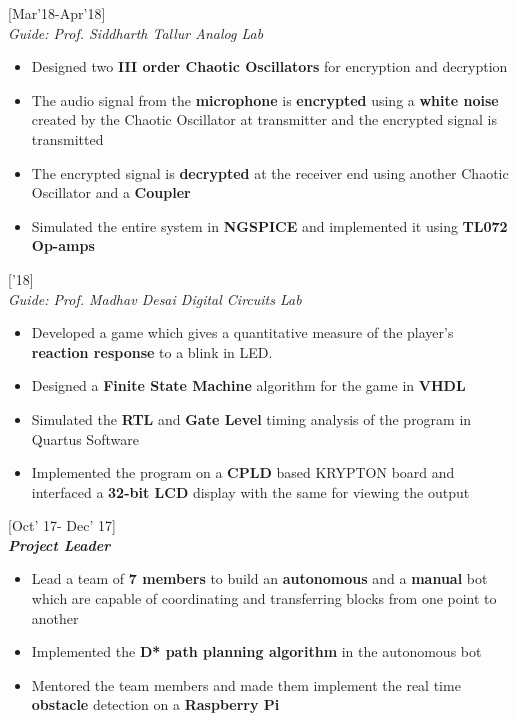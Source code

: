 \documentclass{article}
\begin{document}
 \hfill{\small [Mar'18-Apr'18]}\\
{\it Guide: Prof. Siddharth Tallur \textbar Analog Lab} \\
\vspace{-17pt}
\begin{itemize}[itemsep = -0.75 mm, leftmargin=*]
\item Designed two {\bf III order Chaotic Oscillators} for encryption and decryption
\item The audio signal from the {\bf microphone} is {\bf encrypted} using a {\bf white noise} created by the Chaotic Oscillator at transmitter and the encrypted signal is transmitted
\item The encrypted signal is {\bf decrypted} at the receiver end using another Chaotic Oscillator and a {\bf Coupler}
\item Simulated the entire system in {\bf NGSPICE} and implemented it using {\bf TL072 Op-amps}
\end{itemize}
 \hfill{\small ['18]}\\
{\it Guide: Prof. Madhav Desai \textbar Digital Circuits Lab} \\
\vspace{-17pt}
\begin{itemize}[itemsep = -0.75 mm, leftmargin=*]
\item Developed a game which gives a quantitative measure of the player's {\bf reaction response} to a blink in LED.
\item Designed a {\bf Finite State Machine} algorithm for the game in {\bf VHDL}
\item Simulated the {\bf RTL} and {\bf Gate Level} timing analysis of the program in Quartus Software
\item Implemented the program on a {\bf CPLD} based KRYPTON board and interfaced a {\bf 32-bit LCD} display with the same for viewing the output
\end{itemize}
\pagebreak
{} \hfill{\small [Oct' 17- Dec' 17]}\\
{\it \textbf{Project Leader}} \\
\vspace{-17pt}
\begin{itemize}[itemsep = -0.75 mm, leftmargin=*]
\item {Lead a team of \textbf{7 members} to build an \textbf{autonomous} and a \textbf{manual} bot which are capable of coordinating and transferring blocks from one point to another}
\item Implemented the {\bf D* path planning algorithm} in the autonomous bot
\item {Mentored the team members and made them implement the real time \textbf{obstacle} detection on a \textbf{Raspberry Pi}}
\end{itemize}
\end{document}
